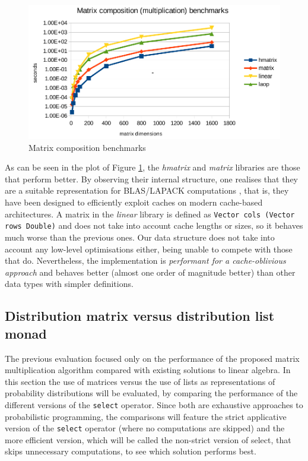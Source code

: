 \documentclass[
  oneside,
  11pt, a4paper,
  footinclude=true,
  headinclude=true,
  cleardoublepage=empty
]{scrbook}
\theoremstyle{definition}
\theoremstyle{definition}
\begin{document}
    \begin{figure}[H]%
    \centering
      \includegraphics[width=\linewidth]{img/report1.pdf}
        \caption{Matrix composition benchmarks}
        \label{fig:bench}
    \end{figure}
    
    As can be seen in the plot of Figure \ref{fig:bench}, the \emph{hmatrix} and \emph{matrix} libraries are those that perform better. By observing their internal structure, one realises that they are a suitable representation for BLAS/LAPACK computations \citep{anderson1999lapack}, that is, they have been designed to efficiently exploit caches on modern cache-based architectures. A matrix in the \emph{linear} library is defined as \texttt{Vector cols (Vector rows Double)} and does not take into account cache lengths or sizes, so it behaves much worse than the previous ones. Our data structure does not take into account any low-level optimisations either, being unable to compete with those that do. Nevertheless, the implementation is \emph{performant for a cache-oblivious approach} and behaves better (almost one order of magnitude better) than other data types with simpler definitions.
        
        \subsection{Distribution matrix versus distribution list monad}
        
        The previous evaluation focused only on the performance of the proposed matrix multiplication algorithm compared with existing solutions to linear algebra. In this section the use of matrices versus the use of lists as representations of probability distributions will be evaluated, by comparing the performance of the different versions of the \texttt{select} operator. Since both are exhaustive approaches to probabilistic programming, the comparisons will feature the strict applicative version of the \texttt{select} operator (where no computations are skipped) and the more efficient version, which will be called the non-strict version of select, that skips unnecessary computations, to see which solution performs best.
        
\end{document}

